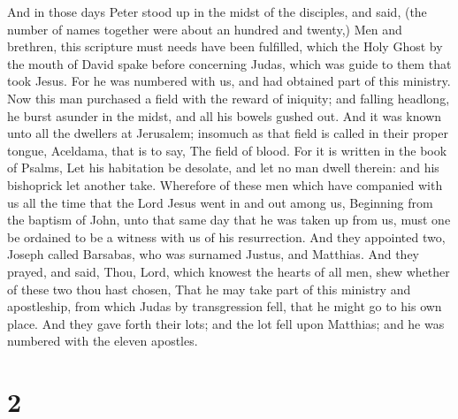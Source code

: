  And in those days Peter stood up in the midst of the
disciples, and said, (the number of names together were about an hundred
and twenty,)  Men and brethren, this scripture must needs
have been fulfilled, which the Holy Ghost by the mouth of David spake
before concerning Judas, which was guide to them that took Jesus.
 For he was numbered with us, and had obtained part of this
ministry.  Now this man purchased a field with the reward
of iniquity; and falling headlong, he burst asunder in the midst, and
all his bowels gushed out.  And it was known unto all the
dwellers at Jerusalem; insomuch as that field is called in their proper
tongue, Aceldama, that is to say, The field of blood.  For
it is written in the book of Psalms, Let his habitation be desolate, and
let no man dwell therein: and his bishoprick let another take.
 Wherefore of these men which have companied with us all
the time that the Lord Jesus went in and out among us, 
Beginning from the baptism of John, unto that same day that he was taken
up from us, must one be ordained to be a witness with us of his
resurrection.  And they appointed two, Joseph called
Barsabas, who was surnamed Justus, and Matthias.  And they
prayed, and said, Thou, Lord, which knowest the hearts of all men, shew
whether of these two thou hast chosen,  That he may take
part of this ministry and apostleship, from which Judas by transgression
fell, that he might go to his own place.  And they gave
forth their lots; and the lot fell upon Matthias; and he was numbered
with the eleven apostles.

\hypertarget{section-1}{%
\section{2}\label{section-1}}


